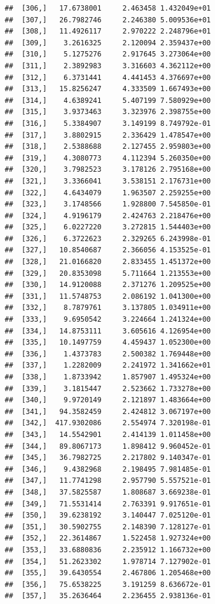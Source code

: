 \documentclass[article]{jss}\usepackage[]{graphicx}\usepackage[]{xcolor}
\makeatletter
\newenvironment{kframe}{%
 \def\at@end@of@kframe{}%
 \ifinner\ifhmode%
  \def\at@end@of@kframe{\end{minipage}}%
  \begin{minipage}{\columnwidth}%
 \fi\fi%
 \def\FrameCommand##1{\hskip\@totalleftmargin \hskip-\fboxsep
 \colorbox{shadecolor}{##1}\hskip-\fboxsep
     \hskip-\linewidth \hskip-\@totalleftmargin \hskip\columnwidth}%
 \MakeFramed {\advance\hsize-\width
   \@totalleftmargin\z@ \linewidth\hsize
   \@setminipage}}%
 {\par\unskip\endMakeFramed%
 \at@end@of@kframe}
\newenvironment{knitrout}{}{} %
\makeatother
\begin{document}
\begin{knitrout}
\begin{kframe}
\begin{verbatim}
##  [306,]   17.6738001     2.463458 1.432049e+01
##  [307,]   26.7982746     2.246380 5.009536e+01
##  [308,]   11.4926117     2.970222 2.248796e+01
##  [309,]    3.2616325     2.120094 2.359437e+00
##  [310,]    5.1275276     2.917645 3.273064e+00
##  [311,]    2.3892983     3.316603 4.362112e+00
##  [312,]    6.3731441     4.441453 4.376697e+00
##  [313,]   15.8256247     4.333509 1.667493e+00
##  [314,]    4.6389241     5.407199 7.580929e+00
##  [315,]    3.9373463     3.323976 2.398755e+00
##  [316,]    5.3384907     3.149199 8.749792e-01
##  [317,]    3.8802915     2.336429 1.478547e+00
##  [318,]    2.5388688     2.127455 2.959803e+00
##  [319,]    4.3080773     4.112394 5.260350e+00
##  [320,]    3.7982523     3.178126 2.795168e+00
##  [321,]    3.3366041     3.538151 2.176731e+00
##  [322,]    4.6434079     1.963507 2.259255e+00
##  [323,]    3.1748566     1.928800 7.545850e-01
##  [324,]    4.9196179     2.424763 2.218476e+00
##  [325,]    6.0227220     3.272815 1.544403e+00
##  [326,]    6.3722623     2.329265 6.243998e-01
##  [327,]   10.8540687     2.366056 4.153525e-01
##  [328,]   21.0166820     2.833455 1.451372e+00
##  [329,]   20.8353098     5.711664 1.213553e+00
##  [330,]   14.9120088     2.371276 1.209525e+00
##  [331,]   11.5748753     2.086192 1.041300e+00
##  [332,]    8.7879761     3.137805 1.034911e+00
##  [333,]    9.6950542     3.224664 1.241324e+00
##  [334,]   14.8753111     3.605616 4.126954e+00
##  [335,]   10.1497759     4.459437 1.052300e+00
##  [336,]    1.4373783     2.500382 1.769448e+00
##  [337,]    1.2282009     2.241972 1.341662e+01
##  [338,]    1.8733942     1.857907 1.495324e+00
##  [339,]    3.1815447     2.523662 1.733278e+00
##  [340,]    9.9720149     2.121897 1.483664e+00
##  [341,]   94.3582459     2.424812 3.067197e+00
##  [342,]  417.9302086     2.554974 7.320198e-01
##  [343,]   14.5542901     2.414139 1.011458e+00
##  [344,]   89.8067173     1.898412 9.960452e-01
##  [345,]   36.7982725     2.217802 9.140347e-01
##  [346,]    9.4382968     2.198495 7.981485e-01
##  [347,]   11.7741298     2.957790 5.557521e-01
##  [348,]   37.5825587     1.808687 3.669238e-01
##  [349,]   71.5531414     2.763391 9.917651e-01
##  [350,]   39.6238192     3.140447 7.025120e-01
##  [351,]   30.5902755     2.148390 7.128127e-01
##  [352,]   22.3614867     1.522458 1.927324e+00
##  [353,]   33.6880836     2.235912 1.166732e+00
##  [354,]   51.2623302     1.978714 7.127902e-01
##  [355,]   39.6430554     2.467806 1.205468e+00
##  [356,]   75.6538225     3.191259 8.636672e-01
##  [357,]   35.2636464     2.236455 2.938136e-01

\end{verbatim}
\end{kframe}
\end{knitrout}
\end{document}
